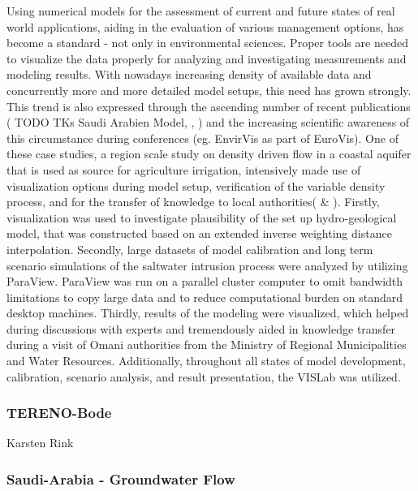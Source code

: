 Using numerical models for the assessment of current and future states
of real world applications, aiding in the evaluation of various
management options, has become a standard - not only in environmental
sciences. Proper tools are needed to visualize the data properly for
analyzing and investigating measurements and modeling results. With
nowadays increasing density of available data and concurrently more and
more detailed model setups, this need has grown strongly. This trend is
also expressed through the ascending number of recent publications (
TODO TKs Saudi Arabien Model, \cite{sun:ees}, \cite{helbig:envirvis}) and the increasing scientific awareness
of this circumstance during conferences (eg. EnvirVis as part of
EuroVis). One of these case studies, a region scale study on density
driven flow in a coastal aquifer that is used as source for agriculture
irrigation, intensively made use of visualization options during model
setup, verification of the variable density process, and for the
transfer of knowledge to local authorities(\cite{walther:cam} \& \cite{walther:eesenvirvis}). Firstly, visualization was used to investigate plausibility of
the set up hydro-geological model, that was constructed based on an
extended inverse weighting distance interpolation\cite{walther:modelcare}. Secondly, large datasets of model calibration and long term
scenario simulations of the saltwater intrusion process were analyzed by
utilizing ParaView. ParaView was run on a parallel cluster computer to
omit bandwidth limitations to copy large data and to reduce
computational burden on standard desktop machines. Thirdly, results of
the modeling were visualized, which helped during discussions with
experts and tremendously aided in knowledge transfer during a visit of
Omani authorities from the Ministry of Regional Municipalities and Water
Resources. Additionally, throughout all states of model development,
calibration, scenario analysis, and result presentation, the VISLab was
utilized.

\subsubsection{TERENO-Bode}\label{tereno-bode}

Karsten Rink

\subsubsection{Saudi-Arabia - Groundwater
Flow}\label{saudi-arabia---groundwater-flow}

